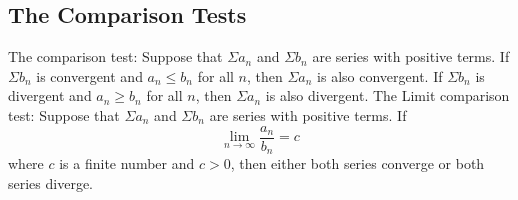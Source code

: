 \documentclass{article}
\begin{document}
\begin{multicols}{2}
    \subsection{The Comparison Tests}
    \begin{outline}
        \1 The comparison test: Suppose that \(\Sigma a_n\) and \(\Sigma b_n\) are series with positive terms. 
            \2 If \(\Sigma b_n\) is convergent and \(a_n\leq b_n\) for all $n$, then \(\Sigma a_n\) is also convergent. 
            \2 If \(\Sigma b_n\) is divergent and \(a_n\geq b_n\) for all $n$, then \(\Sigma a_n\) is also divergent. 
        \1 The Limit comparison test: Suppose that \(\Sigma a_n\) and \(\Sigma b_n\) are series with positive terms. If \[\lim_{n\to\infty}\dfrac{a_n}{b_n}=c\] where $c$ is a finite number and \(c>0\), then either both series converge or both series diverge. 

    \end{outline}\end{multicols}
\end{document}
